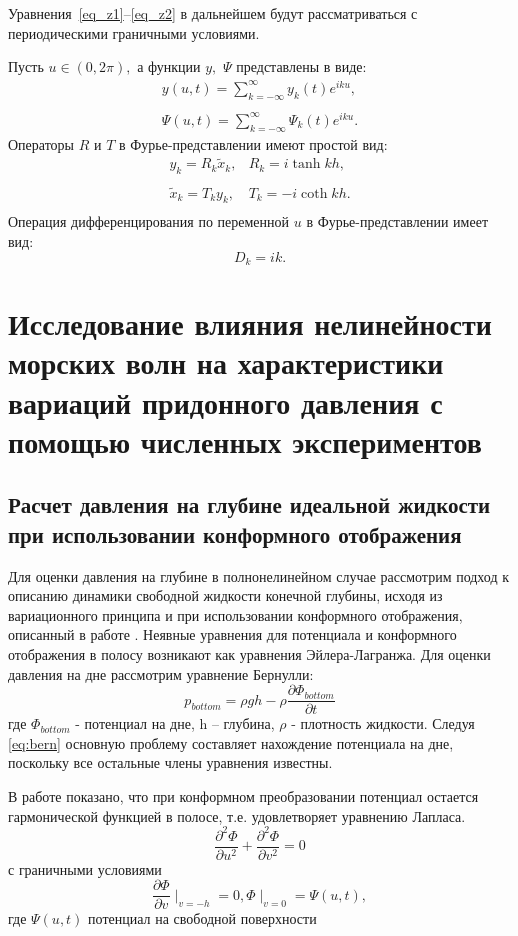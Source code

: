Уравнения~\eqref{eq_z1}--\eqref{eq_z2} в дальнейшем будут рассматриваться с
периодическими граничными условиями.

Пусть $u\in(0,2\pi),$ а функции $y,$ $\Psi$ представлены в виде:
\begin{gather*}\label{eq_kn}
y(u,t)=\sum\limits_{k=-\infty}^{\infty}y_k(t)e^{iku},
\\
\\
\Psi(u,t)=\sum\limits_{k=-\infty}^{\infty}\Psi_k(t)e^{iku}.
\end{gather*}
Операторы $R$ и $T$ в Фурье-представлении имеют простой вид:
$$
\begin{array}{ll}
y_k=R_k \tilde x_k, & R_k=i\tanh kh, \\
\\
\tilde x_k=T_ky_k, & T_k=-i\coth kh. \\
\end{array}
$$
Операция дифференцирования по переменной $u$ в Фурье-представлении
имеет вид:
$$
D_k=ik.
$$

\section{Исследование влияния нелинейности морских волн на характеристики вариаций придонного давления с помощью численных экспериментов} \label{sect3_2}
\subsection{Расчет давления на глубине идеальной жидкости при использовании конформного отображения}
Для оценки давления на глубине в полнонелинейном случае рассмотрим подход к описанию динамики свободной жидкости конечной глубины, исходя из вариационного принципа и при использовании конформного отображения, описанный в работе \cite{DiachZK1996}. Неявные уравнения для потенциала и конформного отображения в полосу возникают как уравнения Эйлера-Лагранжа.
Для оценки давления на дне рассмотрим уравнение Бернулли:
\begin{equation}\label{eq:bern}
p_{bottom}=\rho gh-\rho \frac{\partial\Phi_{bottom}}{\partial t}
\end{equation}
где  $\Phi_{bottom}$ - потенциал на дне, h – глубина, $\rho$ - плотность жидкости. Следуя \eqref{eq:bern} основную проблему составляет нахождение потенциала на дне, поскольку все остальные члены уравнения известны.

В работе \cite{DiachZK1996} показано, что при конформном преобразовании потенциал   остается гармонической функцией в полосе, т.е. удовлетворяет уравнению Лапласа.
\begin{equation}\label{eq:laplas}
\frac{\partial^2\Phi}{\partial u^2}+\frac{\partial^2\Phi}{\partial v^2} = 0
\end{equation}
с граничными условиями
\begin{equation}\label{eq:laplasGranUsl}
\frac{\partial\Phi}{\partial v}\mid_{v=-h}=0, \Phi\mid_{v=0}=\Psi(u,t),
\end{equation}
где $\Psi(u,t)$ потенциал на свободной поверхности

